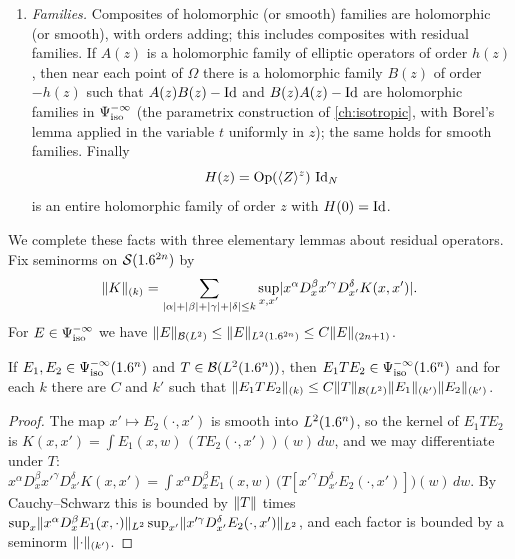 \begin{enumerate}[resume*]
\item\label{determinants:I:families} \emph{Families.} Composites of
  holomorphic (or smooth) families are holomorphic (or smooth), with orders
  adding; this includes composites with residual families. If $A(z)$ is a
  holomorphic family of elliptic operators of order $h(z)$, then near each
  point of $\Omega$ there is a holomorphic family $B(z)$ of order $-h(z)$ such
  that $A(z)B(z)-\operatorname{Id}$ and $B(z)A(z)-\operatorname{Id}$ are holomorphic families in
  $\Psi^{-\infty}_{\mathrm{iso}}$ (the parametrix construction of \cref{ch:isotropic}, with
  Borel's lemma applied in the variable $t$ uniformly in $z$); the same holds
  for smooth families. Finally
  \begin{equation}\label{determinants:eq:standard-regularizer}
    H(z)=\operatorname{Op}(\langle Z\rangle^z)\,\operatorname{Id}_N
  \end{equation}
  is an entire holomorphic family of order $z$ with $H(0)=\operatorname{Id}$.
\end{enumerate}

We complete these facts with three elementary lemmas about residual
operators. Fix seminorms on $\mathcal{S}(1.6^{2n})$ by
\begin{equation*}
  \lVert K\rVert_{(k)}=\sum_{\lvert \alpha\rvert+\lvert \beta\rvert+\lvert \gamma\rvert+\lvert \delta\rvert\le k}
  \sup_{x,x'}\lvert x^\alpha D_x^\beta x'^\gamma D_{x'}^\delta K(x,x')\rvert.
\end{equation*}
For $E\in\Psi^{-\infty}_{\mathrm{iso}}$ we have $\lVert E\rVert_{\mathcal{B}(L^2)}\le\lVert E\rVert_{L^2(1.6^{2n})}\le C\lVert E\rVert_{(2n+1)}$.

\begin{lemma}\label{determinants:lem:trilinear}
  If $E_1,E_2\in\Psi^{-\infty}_{\mathrm{iso}}(1.6^n)$ and $T\in\mathcal{B}(L^2(1.6^n))$, then
  $E_1TE_2\in\Psi^{-\infty}_{\mathrm{iso}}(1.6^n)$ and for each $k$ there are $C$ and $k'$
  such that $\lVert E_1TE_2\rVert_{(k)}\le C\lVert T\rVert_{\mathcal{B}(L^2)}\lVert E_1\rVert_{(k')}\lVert E_2\rVert_{(k')}$.
\end{lemma}
\begin{proof}
  The map $x'\mapsto E_2(\cdot,x')$ is smooth into $L^2(1.6^n)$, so the kernel
  of $E_1TE_2$ is $K(x,x')=\int E_1(x,w)\,(TE_2(\cdot,x'))(w)\,dw$, and we may
  differentiate under $T$:
  $x^\alpha D_x^\beta x'^\gamma D_{x'}^\delta K(x,x')=\int x^\alpha D_x^\beta E_1(x,w)\,\bigl(T[x'^\gamma D_{x'}^\delta E_2(\cdot,x')]\bigr)(w)\,dw$.
  By Cauchy--Schwarz this is bounded by $\lVert T\rVert$ times
  $\sup_x\lVert x^\alpha D_x^\beta E_1(x,\cdot)\rVert_{L^2}\sup_{x'}\lVert x'^\gamma D_{x'}^\delta E_2(\cdot,x')\rVert_{L^2}$,
  and each factor is bounded by a seminorm $\lVert \cdot\rVert_{(k')}$.
\end{proof}

